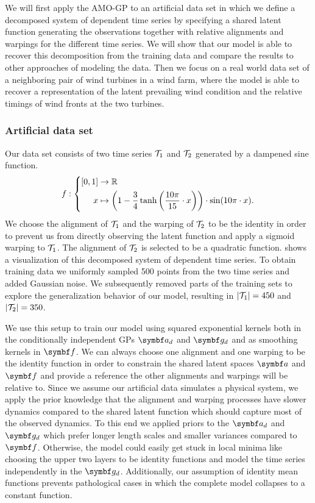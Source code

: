 We will first apply the AMO-GP to an artificial data set in which we define a decomposed system of dependent time series by specifying a shared latent function generating the observations together with relative alignments and warpings for the different time series.
We will show that our model is able to recover this decomposition from the training data and compare the results to other approaches of modeling the data.
Then we focus on a real world data set of a neighboring pair of wind turbines in a wind farm, where the model is able to recover a representation of the latent prevailing wind condition and the relative timings of wind fronts at the two turbines.

\subsubsection{Artificial data set}
Our data set consists of two time series $\mathcal{T}_1$ and $\mathcal{T}_2$ generated by a dampened sine function.
\begin{align}
    f : \left\{ \begin{aligned}
        [0, 1] & \to \Rb                                                                                                          \\
        x      & \mapsto \left( 1 - \frac{3}{4} \tanh \left( \frac{10\pi}{15} \cdot x \right) \right) \cdot \sin (10\pi \cdot x).
    \end{aligned}\right.
\end{align}
We choose the alignment of $\mathcal{T}_1$ and the warping of $\mathcal{T}_2$ to be the identity in order to prevent us from directly observing the latent function and apply a sigmoid warping to $\mathcal{T}_1$.
The alignment of $\mathcal{T}_2$ is selected to be a quadratic function.
 shows a visualization of this decomposed system of dependent time series.
To obtain training data we uniformly sampled 500 points from the two time series and added Gaussian noise.
We subsequently removed parts of the training sets to explore the generalization behavior of our model, resulting in $\vert\mathcal{T}_1\vert= 450$ and $\vert\mathcal{T}_2\vert = 350$.

We use this setup to train our model using squared exponential kernels both in the conditionally independent GPs $\rv{a}_d$ and $\rv{g}_d$ and as smoothing kernels in $\rv{f}$.
We can always choose one alignment and one warping to be the identity function in order to constrain the shared latent spaces $\rv{a}$ and $\rv{f}$ and provide a reference the other alignments and warpings will be relative to.
Since we assume our artificial data simulates a physical system, we apply the prior knowledge that the alignment and warping processes have slower dynamics compared to the shared latent function which should capture most of the observed dynamics.
To this end we applied priors to the $\rv{a}_d$ and $\rv{g}_d$ which prefer longer length scales and smaller variances compared to $\rv{f}$.
Otherwise, the model could easily get stuck in local minima like choosing the upper two layers to be identity functions and model the time series independently in the $\rv{g}_d$.
Additionally, our assumption of identity mean functions prevents pathological cases in which the complete model collapses to a constant function.

